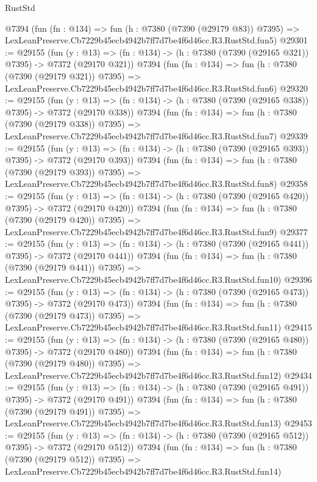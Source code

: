 \begin{lexlean}{RustStd}
\begin{coremodule}
    @7394
    (fun (fn : @134) =>
    fun (h : @7380 (@7390 (@29179 @83)) @7395) =>
    LexLeanPreserve.Cb7229b45ecb4942b7ff7d7be4f6d46cc.R3.RustStd.fun5)
@29301 := @29155
    (fun (y : @13) => (fn : @134) -> (h : @7380 (@7390 (@29165 @321)) @7395) -> @7372 (@29170 @321))
    @7394
    (fun (fn : @134) =>
    fun (h : @7380 (@7390 (@29179 @321)) @7395) =>
    LexLeanPreserve.Cb7229b45ecb4942b7ff7d7be4f6d46cc.R3.RustStd.fun6)
@29320 := @29155
    (fun (y : @13) => (fn : @134) -> (h : @7380 (@7390 (@29165 @338)) @7395) -> @7372 (@29170 @338))
    @7394
    (fun (fn : @134) =>
    fun (h : @7380 (@7390 (@29179 @338)) @7395) =>
    LexLeanPreserve.Cb7229b45ecb4942b7ff7d7be4f6d46cc.R3.RustStd.fun7)
@29339 := @29155
    (fun (y : @13) => (fn : @134) -> (h : @7380 (@7390 (@29165 @393)) @7395) -> @7372 (@29170 @393))
    @7394
    (fun (fn : @134) =>
    fun (h : @7380 (@7390 (@29179 @393)) @7395) =>
    LexLeanPreserve.Cb7229b45ecb4942b7ff7d7be4f6d46cc.R3.RustStd.fun8)
@29358 := @29155
    (fun (y : @13) => (fn : @134) -> (h : @7380 (@7390 (@29165 @420)) @7395) -> @7372 (@29170 @420))
    @7394
    (fun (fn : @134) =>
    fun (h : @7380 (@7390 (@29179 @420)) @7395) =>
    LexLeanPreserve.Cb7229b45ecb4942b7ff7d7be4f6d46cc.R3.RustStd.fun9)
@29377 := @29155
    (fun (y : @13) => (fn : @134) -> (h : @7380 (@7390 (@29165 @441)) @7395) -> @7372 (@29170 @441))
    @7394
    (fun (fn : @134) =>
    fun (h : @7380 (@7390 (@29179 @441)) @7395) =>
    LexLeanPreserve.Cb7229b45ecb4942b7ff7d7be4f6d46cc.R3.RustStd.fun10)
@29396 := @29155
    (fun (y : @13) => (fn : @134) -> (h : @7380 (@7390 (@29165 @473)) @7395) -> @7372 (@29170 @473))
    @7394
    (fun (fn : @134) =>
    fun (h : @7380 (@7390 (@29179 @473)) @7395) =>
    LexLeanPreserve.Cb7229b45ecb4942b7ff7d7be4f6d46cc.R3.RustStd.fun11)
@29415 := @29155
    (fun (y : @13) => (fn : @134) -> (h : @7380 (@7390 (@29165 @480)) @7395) -> @7372 (@29170 @480))
    @7394
    (fun (fn : @134) =>
    fun (h : @7380 (@7390 (@29179 @480)) @7395) =>
    LexLeanPreserve.Cb7229b45ecb4942b7ff7d7be4f6d46cc.R3.RustStd.fun12)
@29434 := @29155
    (fun (y : @13) => (fn : @134) -> (h : @7380 (@7390 (@29165 @491)) @7395) -> @7372 (@29170 @491))
    @7394
    (fun (fn : @134) =>
    fun (h : @7380 (@7390 (@29179 @491)) @7395) =>
    LexLeanPreserve.Cb7229b45ecb4942b7ff7d7be4f6d46cc.R3.RustStd.fun13)
@29453 := @29155
    (fun (y : @13) => (fn : @134) -> (h : @7380 (@7390 (@29165 @512)) @7395) -> @7372 (@29170 @512))
    @7394
    (fun (fn : @134) =>
    fun (h : @7380 (@7390 (@29179 @512)) @7395) =>
    LexLeanPreserve.Cb7229b45ecb4942b7ff7d7be4f6d46cc.R3.RustStd.fun14)

\end{coremodule}
\end{lexlean}
